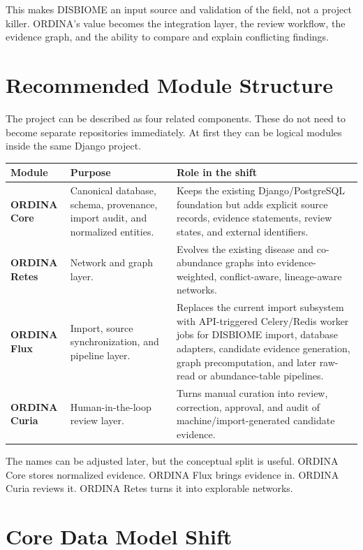 \documentclass[11pt,a4paper]{article}
\begin{document}
This makes DISBIOME an input source and validation of the field, not a project killer. ORDINA's value becomes the integration layer, the review workflow, the evidence graph, and the ability to compare and explain conflicting findings.

\section{Recommended Module Structure}

The project can be described as four related components. These do not need to become separate repositories immediately. At first they can be logical modules inside the same Django project.

\begin{longtable}{p{}p{}p{}}
\toprule
\textbf{Module} & \textbf{Purpose} & \textbf{Role in the shift} \\
\midrule
\textbf{ORDINA Core} & Canonical database, schema, provenance, import audit, and normalized entities. & Keeps the existing Django/PostgreSQL foundation but adds explicit source records, evidence statements, review states, and external identifiers. \\
\textbf{ORDINA Retes} & Network and graph layer. & Evolves the existing disease and co-abundance graphs into evidence-weighted, conflict-aware, lineage-aware networks. \\
\textbf{ORDINA Flux} & Import, source synchronization, and pipeline layer. & Replaces the current import subsystem with API-triggered Celery/Redis worker jobs for DISBIOME import, database adapters, candidate evidence generation, graph precomputation, and later raw-read or abundance-table pipelines. \\
\textbf{ORDINA Curia} & Human-in-the-loop review layer. & Turns manual curation into review, correction, approval, and audit of machine/import-generated candidate evidence. \\
\bottomrule
\end{longtable}

The names can be adjusted later, but the conceptual split is useful. ORDINA Core stores normalized evidence. ORDINA Flux brings evidence in. ORDINA Curia reviews it. ORDINA Retes turns it into explorable networks.

\section{Core Data Model Shift}
\end{document}
